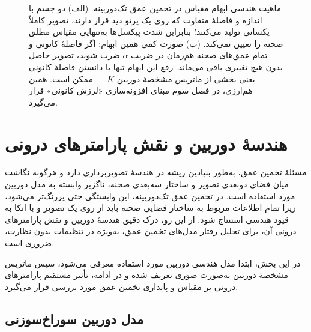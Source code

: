 \begin{figure}[htbp]
    \caption[ماهیت هندسی ابهام مقیاس در تخمین عمق تک‌دوربینه]{ماهیت
    هندسی ابهام مقیاس در تخمین عمق تک‌دوربینه.
    (الف) دو جسم با اندازه و فاصلهٔ متفاوت که روی یک پرتو دید قرار دارند،
    تصویر کاملاً یکسانی تولید می‌کنند؛ بنابراین شدت پیکسل‌ها به‌تنهایی
    مقیاس مطلق صحنه را تعیین نمی‌کند.
    (ب) صورت کمی همین ابهام: اگر فاصلهٔ کانونی و تمام عمق‌های صحنه
    هم‌زمان در ضریب $\alpha$ ضرب شوند، تصویر حاصل بدون هیچ تغییری باقی می‌ماند.
    رفع این ابهام تنها با دانستن فاصلهٔ کانونی --- یعنی بخشی از ماتریس
    مشخصهٔ دوربین $K$ --- ممکن است. همین هم‌ارزی، در فصل سوم مبنای
    افزونه‌سازی «لرزش کانونی» قرار می‌گیرد.}
    \label{fig:scale_ambiguity}
\end{figure}
\section{هندسهٔ دوربین و نقش پارامترهای درونی}

مسئلهٔ تخمین عمق، به‌طور بنیادین ریشه در هندسهٔ تصویربرداری دارد و هرگونه نگاشت میان فضای دوبعدی تصویر و ساختار سه‌بعدی صحنه، ناگزیر وابسته به مدل دوربین مورد استفاده است. در تخمین عمق تک‌دوربینه، این وابستگی حتی پررنگ‌تر می‌شود، زیرا تمام اطلاعات مربوط به ساختار فضایی صحنه باید از روی یک تصویر و با اتکا به قیود هندسی استنتاج شود. از این رو، درک دقیق هندسهٔ دوربین و نقش پارامترهای درونی آن، برای تحلیل رفتار مدل‌های تخمین عمق، به‌ویژه در تنظیمات بدون نظارت، ضروری است.

در این بخش، ابتدا مدل هندسی دوربین مورد استفاده معرفی می‌شود، سپس ماتریس مشخصهٔ دوربین به‌صورت صوری تعریف شده و در ادامه، تأثیر مستقیم پارامترهای درونی بر مقیاس و پایداری تخمین عمق مورد بررسی قرار می‌گیرد.

\subsection{مدل دوربین سوراخ‌سوزنی}

